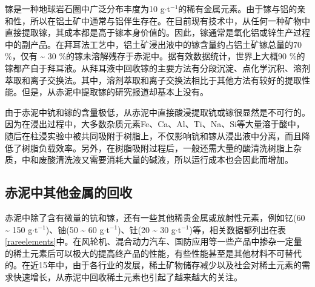 镓是一种地球岩石圈中广泛分布丰度为10 g$ \cdot $t$ ^{\mathrm{-1}} $的稀有金属元素\cite{poledniok2008speciation}。由于镓与铝的亲和性，所以在铝土矿中通常与铝伴生存在。在目前现有技术中，从任何一种矿物中直接提取镓，其成本都是高于镓本身价值的。因此，镓通常是氧化铝或锌生产过程中的副产品。在拜耳法工艺中，铝土矿浸出液中的镓含量约占铝土矿镓总量的70 \%，仅有 \textasciitilde{ }30 \%的镓未溶解残存于赤泥中。据有效数据统计，世界上大概90 \%的镓都产自于拜耳液\cite{lu2008research}。从拜耳液中回收镓的主要方法有分段沉淀、点化学沉积、溶剂萃取和离子交换法。其中，溶剂萃取和离子交换法相比于其他方法有较好的提取性能\cite{zhao2012recovery}。但是，从赤泥中提取镓的研究报道却基本上没有。

由于赤泥中钪和镓的含量极低，从赤泥中直接酸浸提取钪或镓很显然是不可行的。因为在浸出过程中，大多数杂质元素Fe、Ca、Al、Ti、Na、Si等大量溶于酸中，随后在柱浸实验中被共同吸附于树脂上，不仅影响钪和镓从浸出液中分离，而且降低了树脂负载效率。另外，在树脂吸附过程后，一般还需大量的酸清洗树脂上杂质，中和废酸清洗液又需要消耗大量的碱液，所以运行成本也会因此而增加。
\subsection{赤泥中其他金属的回收}
赤泥中除了含有微量的钪和镓，还有一些其他稀贵金属或放射性元素，例如钇(60 \textasciitilde{ }150 g$ \cdot $t$ ^{\mathrm{-1}} $)、铀(50 \textasciitilde{ }60 g$ \cdot $t$ ^{\mathrm{-1}} $)、钍(20 \textasciitilde{ }30 g$ \cdot $t$ ^{\mathrm{-1}} $)等\cite{smirnov1997investigation,borra2015leaching}，相关数据都列出在表\ref{rareelements}中。在风轮机、混合动力汽车、国防应用等一些产品中掺杂一定量的稀土元素后可以极大的提高终产品的性能，有些性能甚至是其他材料不可替代的。在近15年中，由于各行业的发展，稀土矿物储存减少以及社会对稀土元素的需求快速增长，从赤泥中回收稀土元素也引起了越来越大的关注\cite{du2011global}。

